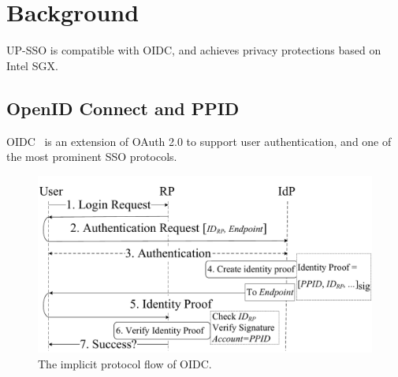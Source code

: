 \section{Background}
\label{sec:background}
UP-SSO is compatible with OIDC, and achieves privacy protections based on Intel SGX.
\subsection{OpenID Connect and PPID}
OIDC~\cite{OpenIDConnect} is an extension of OAuth 2.0 to support user authentication,
 and one of the most prominent SSO protocols.

\begin{figure}[t]
  \centering
  \includegraphics[width=\linewidth]{fig/OIDC1.pdf}
  \vspace{-4mm}
  \caption{The implicit protocol flow of OIDC.}
  \label{fig:OpenID}
  \vspace{-4mm}
\end{figure}

